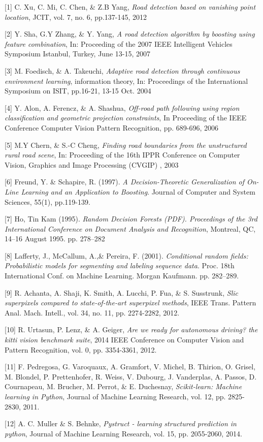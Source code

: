\documentclass{article} %
\begin{document}
\small{
[1] C. Xu, C. Mi, C. Chen, \& Z.B Yang, {\it Road detection based on vanishing point location}, JCIT, vol. 7, no. 6, pp.137-145, 2012

[2] Y. Sha, G.Y Zhang, \& Y. Yang, {\it A road detection algorithm by boosting using feature combination},
In: Proceeding of the 2007 IEEE Intelligent Vehicles Symposium Istanbul, Turkey, June 13-15, 2007

[3] M. Foedisch, \& A. Takeuchi, {\it Adaptive road detection through continuous environment learning},
information theory, In: Proceedings of the International Symposium on ISIT, pp.16-21, 13-15 Oct. 2004

[4] Y. Alon, A. Ferencz, \& A. Shashua, {\it Off-road path following using region classification and geometric projection constraints}, In Proceeding of the IEEE Conference Computer Vision Pattern Recognition, pp. 689-696, 2006

[5] M.Y Chern, \& S.-C Cheng, {\it Finding road boundaries from the unstructured rural road scene}, In: Proceeding of the 16th IPPR Conference on Computer Vision, Graphics and Image Processing (CVGIP) , 2003

[6] Freund, Y. \& Schapire, R. (1997). {\it A Decision-Theoretic Generalization of On-Line Learning and an Application to Boosting}. Journal of Computer and System Sciences, 55(1), pp.119-139.

[7] Ho, Tin Kam (1995). {\it Random Decision Forests (PDF). Proceedings of the 3rd International Conference on Document Analysis and Recognition}, Montreal, QC, 14–16 August 1995. pp. 278–282

[8] Lafferty, J., McCallum, A.,\& Pereira, F. (2001). {\it Conditional random fields: Probabilistic models for segmenting and labeling sequence data}. Proc. 18th International Conf. on Machine Learning. Morgan Kaufmann. pp. 282–289.

[9] R. Achanta, A. Shaji, K. Smith, A. Lucchi, P. Fua, \& S. Susstrunk, {\it Slic superpixels compared to state-of-the-art superpixel methods}, IEEE Trans. Pattern Anal. Mach. Intell., vol. 34, no. 11, pp. 2274-2282, 2012.

[10] R. Urtasun, P. Lenz, \& A. Geiger, {\it Are we ready for autonomous driving? the kitti vision benchmark suite}, 2014 IEEE Conference on Computer Vision and Pattern Recognition, vol. 0, pp. 3354-3361, 2012.

[11] F. Pedregosa, G. Varoquaux, A. Gramfort, V. Michel, B. Thirion, O. Grisel, M. Blondel, P. Prettenhofer, R. Weiss, V. Dubourg, J. Vanderplas, A. Passos, D. Cournapeau, M. Brucher, M. Perrot, \& E. Duchesnay, {\it Scikit-learn: Machine learning in Python}, Journal of Machine Learning Research, vol. 12, pp. 2825-2830, 2011.

[12] A. C. Muller \& S. Behnke, {\it Pystruct - learning structured prediction in python}, Journal of Machine Learning Research, vol. 15, pp. 2055-2060, 2014.
}
\end{document}
